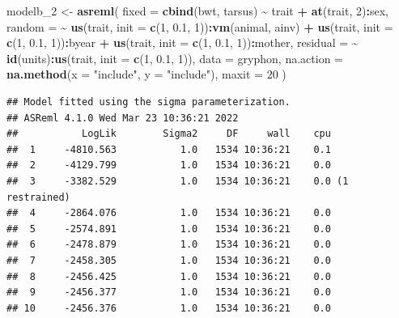 \documentclass[
  12pt,
]{book}
\newenvironment{Shaded}{\begin{snugshade}}{\end{snugshade}}
\newcommand{\DataTypeTok}[1]{\textcolor[rgb]{0.13,0.29,0.53}{#1}}
\newcommand{\DecValTok}[1]{\textcolor[rgb]{0.00,0.00,0.81}{#1}}
\newcommand{\FloatTok}[1]{\textcolor[rgb]{0.00,0.00,0.81}{#1}}
\newcommand{\KeywordTok}[1]{\textcolor[rgb]{0.13,0.29,0.53}{\textbf{#1}}}
\newcommand{\NormalTok}[1]{#1}
\newcommand{\OperatorTok}[1]{\textcolor[rgb]{0.81,0.36,0.00}{\textbf{#1}}}
\newcommand{\StringTok}[1]{\textcolor[rgb]{0.31,0.60,0.02}{#1}}
\begin{document}
\begin{Shaded}
\begin{Highlighting}[]
\NormalTok{modelb\_}\DecValTok{2}\NormalTok{ \textless{}{-}}\StringTok{ }\KeywordTok{asreml}\NormalTok{(}
  \DataTypeTok{fixed =} \KeywordTok{cbind}\NormalTok{(bwt, tarsus) }\OperatorTok{\textasciitilde{}}\StringTok{ }\NormalTok{trait }\OperatorTok{+}\StringTok{ }\KeywordTok{at}\NormalTok{(trait, }\DecValTok{2}\NormalTok{)}\OperatorTok{:}\NormalTok{sex,}
  \DataTypeTok{random =} \OperatorTok{\textasciitilde{}}\StringTok{ }\KeywordTok{us}\NormalTok{(trait, }\DataTypeTok{init =} \KeywordTok{c}\NormalTok{(}\DecValTok{1}\NormalTok{, }\FloatTok{0.1}\NormalTok{, }\DecValTok{1}\NormalTok{))}\OperatorTok{:}\KeywordTok{vm}\NormalTok{(animal, ainv) }\OperatorTok{+}
\StringTok{    }\KeywordTok{us}\NormalTok{(trait, }\DataTypeTok{init =} \KeywordTok{c}\NormalTok{(}\DecValTok{1}\NormalTok{, }\FloatTok{0.1}\NormalTok{, }\DecValTok{1}\NormalTok{))}\OperatorTok{:}\NormalTok{byear }\OperatorTok{+}
\StringTok{    }\KeywordTok{us}\NormalTok{(trait, }\DataTypeTok{init =} \KeywordTok{c}\NormalTok{(}\DecValTok{1}\NormalTok{, }\FloatTok{0.1}\NormalTok{, }\DecValTok{1}\NormalTok{))}\OperatorTok{:}\NormalTok{mother,}
  \DataTypeTok{residual =} \OperatorTok{\textasciitilde{}}\StringTok{ }\KeywordTok{id}\NormalTok{(units)}\OperatorTok{:}\KeywordTok{us}\NormalTok{(trait, }\DataTypeTok{init =} \KeywordTok{c}\NormalTok{(}\DecValTok{1}\NormalTok{, }\FloatTok{0.1}\NormalTok{, }\DecValTok{1}\NormalTok{)),}
  \DataTypeTok{data =}\NormalTok{ gryphon,}
  \DataTypeTok{na.action =} \KeywordTok{na.method}\NormalTok{(}\DataTypeTok{x =} \StringTok{"include"}\NormalTok{, }\DataTypeTok{y =} \StringTok{"include"}\NormalTok{),}
  \DataTypeTok{maxit =} \DecValTok{20}
\NormalTok{)}
\end{Highlighting}
\end{Shaded}

\begin{verbatim}
## Model fitted using the sigma parameterization.
## ASReml 4.1.0 Wed Mar 23 10:36:21 2022
##           LogLik        Sigma2     DF     wall    cpu
##  1     -4810.563           1.0   1534 10:36:21    0.1
##  2     -4129.799           1.0   1534 10:36:21    0.0
##  3     -3382.529           1.0   1534 10:36:21    0.0 (1 restrained)
##  4     -2864.076           1.0   1534 10:36:21    0.0
##  5     -2574.891           1.0   1534 10:36:21    0.0
##  6     -2478.879           1.0   1534 10:36:21    0.0
##  7     -2458.305           1.0   1534 10:36:21    0.0
##  8     -2456.425           1.0   1534 10:36:21    0.0
##  9     -2456.377           1.0   1534 10:36:21    0.0
## 10     -2456.376           1.0   1534 10:36:21    0.0
\end{verbatim}
\end{document}
